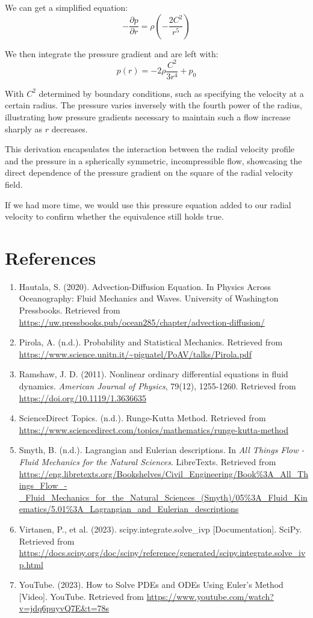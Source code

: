 \documentclass{article}
\begin{document}
We can get a simplified equation:
\begin{equation}
-\frac{\partial p}{\partial r} = \rho \left( -\frac{2C^2}{r^5} \right)
\end{equation}

We then integrate the pressure gradient and are left with:
\begin{equation}
p(r) = -2\rho \frac{C^2}{3r^4} + p_0
\end{equation}

With \( C^2 \) determined by boundary conditions, such as specifying the velocity at a certain radius. The pressure varies inversely with the fourth power of the radius, illustrating how pressure gradients necessary to maintain such a flow increase sharply as \( r \) decreases.

This derivation encapsulates the interaction between the radial velocity profile and the pressure in a spherically symmetric, incompressible flow, showcasing the direct dependence of the pressure gradient on the square of the radial velocity field.

If we had more time, we would use this pressure equation added to our radial velocity to confirm whether the equivalence still holds true.

\section{References}
\begin{enumerate}
    \item Hautala, S. (2020). Advection-Diffusion Equation. In Physics Across Oceanography: Fluid Mechanics and Waves. University of Washington Pressbooks. Retrieved from \url{https://uw.pressbooks.pub/ocean285/chapter/advection-diffusion/}
    \item Pirola, A. (n.d.). Probability and Statistical Mechanics. Retrieved from \url{https://www.science.unitn.it/~pignatel/PoAV/talks/Pirola.pdf}
    \item Ramshaw, J. D. (2011). Nonlinear ordinary differential equations in fluid dynamics. \textit{American Journal of Physics}, 79(12), 1255-1260. Retrieved from \url{https://doi.org/10.1119/1.3636635}
    \item ScienceDirect Topics. (n.d.). Runge-Kutta Method. Retrieved from \url{https://www.sciencedirect.com/topics/mathematics/runge-kutta-method}
    \item Smyth, B. (n.d.). Lagrangian and Eulerian descriptions. In \textit{All Things Flow - Fluid Mechanics for the Natural Sciences}. LibreTexts. Retrieved from \url{https://eng.libretexts.org/Bookshelves/Civil_Engineering/Book\%3A_All_Things_Flow_-_Fluid_Mechanics_for_the_Natural_Sciences_(Smyth)/05\%3A_Fluid_Kinematics/5.01\%3A_Lagrangian_and_Eulerian_descriptions}
    \item Virtanen, P., et al. (2023). scipy.integrate.solve\_ivp [Documentation]. SciPy. Retrieved from \url{https://docs.scipy.org/doc/scipy/reference/generated/scipy.integrate.solve_ivp.html}
    \item YouTube. (2023). How to Solve PDEs and ODEs Using Euler's Method [Video]. YouTube. Retrieved from \url{https://www.youtube.com/watch?v=jdq6puyvQ7E&t=78s}
\end{enumerate}
\end{document}
